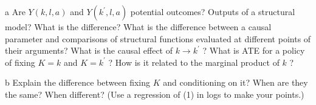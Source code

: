 \documentclass{article}
\begin{document}
\begin{problem}{a}
Are $Y(k, l, a)$ and $Y\left(k^{\prime}, l, a\right)$ potential outcomes? Outputs of a structural model? What is the difference? What is the difference between a causal parameter and comparisons of structural functions evaluated at different points of their arguments? What is the causal effect of $k \rightarrow k^{\prime}$ ? What is ATE for a policy of fixing $K=k$ and $K=k^{\prime}$ ? How is it related to the marginal product of $k$ ?
\end{problem}

\begin{problem}{b}
Explain the difference between fixing $K$ and conditioning on it? When are they the same? When different? (Use a regression of (1) in logs to make your points.)
\end{problem}

\newpage
\end{document}
